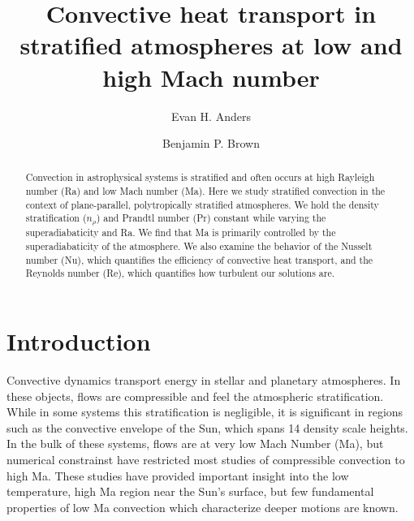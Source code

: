 \documentclass[aps, prl, twocolumn, nofootinbib, groupedaddress, amsfonts, amssymb, amsmath]{revtex4-1}
\newcommand{\RB}{Rayleigh-B\'{e}nard }
\begin{document}
\author{Evan H. Anders}
\author{Benjamin P. Brown}
\title{Convective heat transport in stratified atmospheres at low and high Mach number}

\begin{abstract}
Convection in astrophysical systems is stratified and
often occurs at high Rayleigh number (Ra) and low
Mach number (Ma).
Here we study stratified convection in the context of 
plane-parallel, polytropically stratified atmospheres. 
We hold the density stratification ($n_{\rho}$) and Prandtl 
number (Pr) constant while varying the superadiabaticity
and Ra.  We find that Ma is primarily controlled by the
superadiabaticity of the atmosphere.  We also examine
the behavior of the Nusselt number (Nu), 
which quantifies the efficiency of convective heat transport,
and the Reynolds number (Re), which quantifies how turbulent our
solutions are.
\end{abstract}
\maketitle


\section{Introduction}
\label{sec:intro}
Convective dynamics transport energy in stellar and planetary atmospheres.
In these objects, flows are compressible and
feel the atmospheric stratification.  While in some systems this stratification is
negligible, it is significant in regions such as
the convective envelope of the Sun, which spans 14 density scale heights.
In the bulk of these systems, flows are at very low Mach Number (Ma), but numerical
constrainst have restricted most studies of compressible convection to high Ma.
These studies have provided important insight into the low temperature, high Ma region
near the Sun's surface, but few fundamental
properties of low Ma convection which characterize deeper motions
are known.
\end{document}
